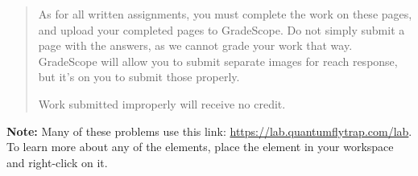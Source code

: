 \documentclass[12pt]{article}
\begin{document}

\begin{quote}
    As for all written assignments, you must complete the work on these pages, and upload your completed pages to GradeScope.  Do not simply submit a page with the answers, as we cannot grade your work that way.  GradeScope will allow you to submit separate images for reach response, but it's on you to submit those properly.

    Work submitted improperly will receive no credit.
\end{quote}


\noindent \textbf{Note:} Many of these problems use this link: \href{https://lab.quantumflytrap.com/lab}{https://lab.quantumflytrap.com/lab}. To learn more about any of the elements, place the element in your workspace and right-click on it.
\end{document}

